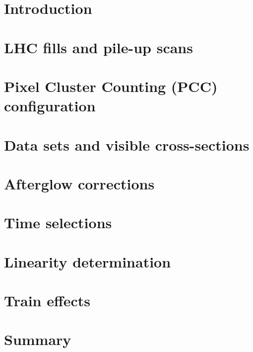 \maketitle %
\section{Introduction}

\section{LHC fills and pile-up scans}

\clearpage
\newpage
\section{Pixel Cluster Counting (PCC) configuration}

\clearpage
\newpage
\section{Data sets and visible cross-sections}

\clearpage
\newpage
\section{Afterglow corrections}

\clearpage
\newpage
\section{Time selections}

\clearpage
\newpage
\section{Linearity determination}

\clearpage
\newpage
\section{Train effects}

\clearpage
\newpage
\section{Summary}



